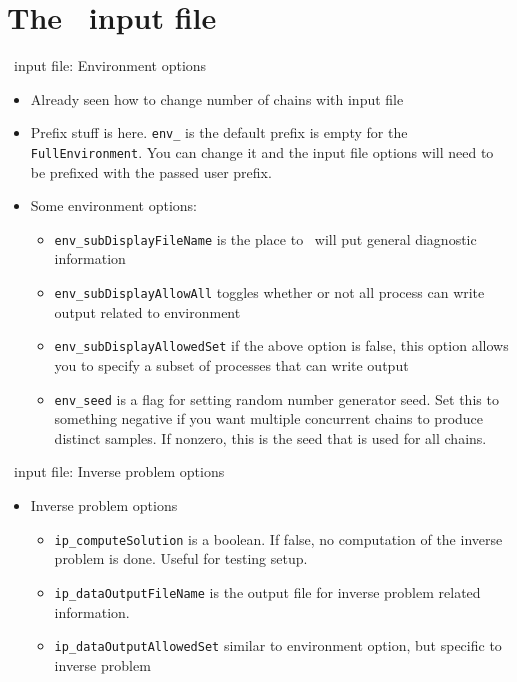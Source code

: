 \section{The \Queso\ input file}
\begin{frame}[fragile]{\Queso\ input file: Environment options}
  \begin{itemize}
    \item Already seen how to change number of chains with input file
    \item Prefix stuff is here.  \texttt{env\_} is the default prefix is empty
      for the \texttt{FullEnvironment}.  You can change it and the
      input file options will need to be prefixed with the passed user prefix.
    \item Some environment options:
      \begin{itemize}
        \item \texttt{env\_subDisplayFileName} is the place to \Queso\ will
          put general diagnostic information
        \item \texttt{env\_subDisplayAllowAll} toggles whether or not all
          process can write output related to environment
        \item \texttt{env\_subDisplayAllowedSet} if the above option is false,
          this option allows you to specify a subset of processes that can
          write output
        \item \texttt{env\_seed} is a flag for setting random number generator
          seed.  Set this to something negative if you want multiple concurrent
          chains to produce distinct samples.  If nonzero, this is the seed
          that is used for all chains.
      \end{itemize}
  \end{itemize}
\end{frame}

\begin{frame}[fragile]{\Queso\ input file: Inverse problem options}
  \begin{itemize}
    \item Inverse problem options
      \begin{itemize}
        \item \texttt{ip\_computeSolution} is a boolean.  If false, no
          computation of the inverse problem is done.  Useful for testing
          setup.
        \item \texttt{ip\_dataOutputFileName} is the output file for inverse
          problem related information.
        \item \texttt{ip\_dataOutputAllowedSet} similar to environment option,
          but specific to inverse problem
      \end{itemize}
  \end{itemize}
\end{frame}

